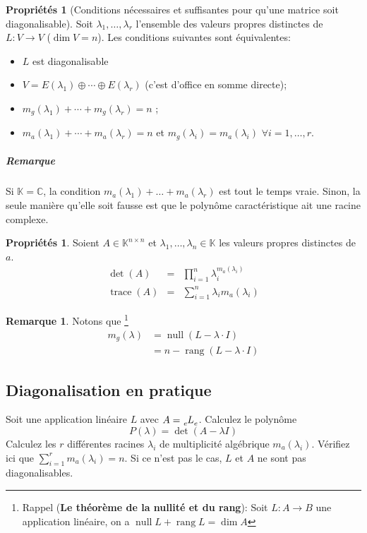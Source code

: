 \documentclass[11pt,a4paper]{article}
\theoremstyle{definition}
\newtheorem{myprop}[mydef]{Propriétés}
\newtheorem{myrem}[mydef]{Remarque}
\DeclareMathOperator{\trace}{trace}
\DeclareMathOperator{\newdim}{dim}
\DeclareMathOperator{\newrang}{rang}
\DeclareMathOperator{\newnull}{null}
\newcommand{\C}{\mathbb{C}}
\newcommand{\K}{\mathbb{K}}
\newcommand{\Knn}{\K^{n \times n}}
\begin{document}
\begin{myprop}[Conditions nécessaires et suffisantes pour qu'une matrice soit diagonalisable]
	Soit $\lambda_1 , \dots , \lambda_r$ l'ensemble des valeurs propres distinctes de $L : V \rightarrow V$ ($\newdim V = n$).
	Les conditions suivantes sont équivalentes:
	\begin{itemize}
		\item $L$ est diagonalisable
		\item $V = E(\lambda_1) \oplus \cdots \oplus E(\lambda_r)$ (c'est d'office en somme directe);
		\item $m_g(\lambda_1) + \cdots + m_g(\lambda_r) = n$ ;
		\item $m_a (\lambda_1) + \cdots + m_a (\lambda_r) = n$ et $m_g(\lambda_i) = m_a (\lambda_i)$ $\forall i = 1, \dots, r$.
	\end{itemize}
	\subparagraph{Remarque}
	Si $\K = \C$, la condition $m_a(\lambda_1) + \dots + m_a(\lambda_r)$ est tout le temps vraie.
	Sinon, la seule manière qu'elle soit fausse est que le polynôme caractéristique ait une racine complexe.
\end{myprop}

\begin{myprop}
	Soient $A \in \Knn$ et $\lambda_1, \dots, \lambda_n \in \K$ les valeurs propres distinctes de $a$.
	\begin{eqnarray*}
		\det(A) &=& \prod_{i = 1}^{n} \lambda_i^{m_a(\lambda_i)}\\
		\trace(A) &=& \sum_{i = 1}^{n} \lambda_i m_a(\lambda_i)
	\end{eqnarray*}
\end{myprop}

\begin{myrem}
	Notons que
	\footnote{Rappel ({\bf Le théorème de la nullité et du rang}):
	Soit $L:A \to B$ une application linéaire, on a $\newnull L + \newrang L = \dim A$}
	\begin{align*}
		m_g(\lambda) & = \newnull (L - \lambda \cdot I) \\
		& = n - \newrang (L - \lambda \cdot I)
	\end{align*}
\end{myrem}

\subsection{Diagonalisation en pratique}
Soit une application linéaire $L$ avec $A = \tensor*[_e]{L}{_e}$.
Calculez le polynôme
\[ P(\lambda) = \det \left( A - \lambda I \right) \]
Calculez les $r$ différentes racines $\lambda_i$ de multiplicité algébrique $m_a(\lambda_i)$.
Vérifiez ici que $\sum_{i=1}^r m_a(\lambda_i) = n$. Si ce n'est pas le cas, $L$ et $A$ ne sont pas diagonalisables.
\end{document}
